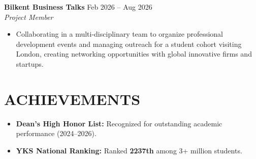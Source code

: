 \documentclass[11pt,a4paper]{article}
\begin{document}
\noindent \textbf{Bilkent Business Talks} \hfill Feb 2026 -- Aug 2026 \\
\textit{Project Member} 
\begin{itemize}
    \item[\textbullet] Collaborating in a multi-disciplinary team to organize professional development events and managing outreach for a student cohort visiting London, creating networking opportunities with global innovative firms and startups.
\end{itemize}


\section{ACHIEVEMENTS}
\begin{itemize}
    \item[\textbullet] \textbf{Dean’s High Honor List:} Recognized for outstanding academic performance (2024–2026).
    \item[\textbullet] \textbf{YKS National Ranking:} Ranked \textbf{2237th} among 3+ million students.
\end{itemize}
\end{document}
